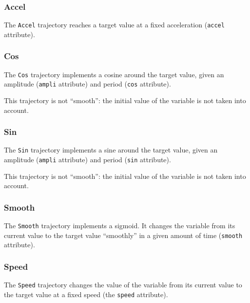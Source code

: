 \subsubsection{Accel}

The \lstinline{Accel} trajectory reaches a target value at a fixed
acceleration (\lstinline{accel} attribute).


\subsubsection{Cos}

The \lstinline{Cos} trajectory implements a cosine around the target
value, given an amplitude (\lstinline{ampli} attribute) and period
(\lstinline{cos} attribute).

This trajectory is not ``smooth'': the initial value of the variable
is not taken into account.


\subsubsection{Sin}

The \lstinline{Sin} trajectory implements a sine around the target
value, given an amplitude (\lstinline{ampli} attribute) and period
(\lstinline{sin} attribute).

This trajectory is not ``smooth'': the initial value of the variable
is not taken into account.


\subsubsection{Smooth}

The \lstinline{Smooth} trajectory implements a sigmoid.  It changes
the variable from its current value to the target value ``smoothly''
in a given amount of time (\lstinline{smooth} attribute).


\subsubsection{Speed}

The \lstinline{Speed} trajectory changes the value of the variable
from its current value to the target value at a fixed speed (the
\lstinline{speed} attribute).

